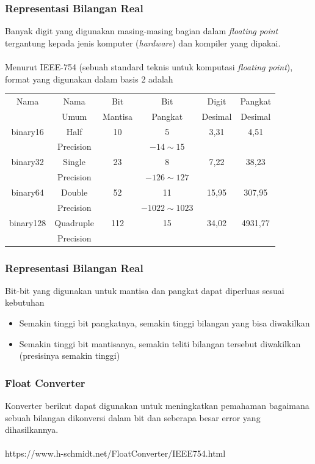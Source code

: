 \documentclass{beamer}
\begin{document}
\begin{frame}
\frametitle{Representasi Bilangan Real}
Banyak digit yang digunakan masing-masing bagian dalam \textit{floating point} tergantung kepada jenis komputer (\textit{hardware}) dan kompiler yang dipakai.
\\\ \\Menurut IEEE-754 (sebuah standard teknis untuk komputasi \textit{floating point}), format yang digunakan dalam basis 2 adalah 
\\\begin{center}\begin{tabular}{|c|c|c|c|c|c|}
\hline
	Nama & Nama & Bit & Bit & Digit & Pangkat \\
	&Umum& Mantisa & Pangkat &Desimal &Desimal\\
\hline
	binary16 & Half & 10 & 5  & 3,31 & 4,51 \\
	&Precision&&$-14 \sim 15$&&\\
\hline
	binary32 & Single & 23 & 8 & 7,22 & 38,23 \\
	&Precision&&$-126\sim 127$&&\\
\hline
	binary64 & Double  & 52 & 11  & 15,95 & 307,95 \\
	&Precision&& $-1022\sim 1023$ &&\\
\hline
	binary128 & Quadruple & 112 & 15  & 34,02 & 4931,77 \\
	&Precision&&&&\\
\hline
\end{tabular}
\end{center}

\end{frame}

\begin{frame}
\frametitle{Representasi Bilangan Real}
Bit-bit yang digunakan untuk mantisa dan pangkat dapat diperluas sesuai kebutuhan 
\begin{itemize}
\item Semakin tinggi bit pangkatnya, semakin tinggi bilangan yang bisa diwakilkan 
\item Semakin tinggi bit mantisanya, semakin teliti bilangan tersebut diwakilkan (presisinya semakin tinggi)
\end{itemize}
\end{frame}

\begin{frame}
\frametitle{Float Converter}
Konverter berikut dapat digunakan untuk meningkatkan pemahaman bagaimana sebuah bilangan dikonversi dalam bit dan seberapa besar error yang dihasilkannya.
\\\ \\
https://www.h-schmidt.net/FloatConverter/IEEE754.html
\end{frame}
\end{document}
